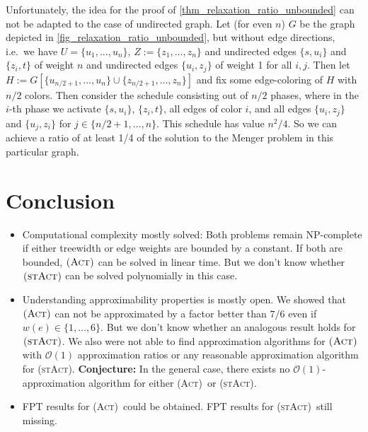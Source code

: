 \documentclass[runningheads]{llncs}
\numberwithin{equation}{section}
\newcommand{\set}[1]{\{ #1 \}}
\newcommand{\fromto}[2]{\set{#1, \ldots, #2}}
\newcommand{\bigO}{\mathcal{O}}
\newcommand{\act}{\textsc{(Act)}}
\newcommand{\stact}{\textsc{(stAct)}}
\DeclareMathOperator{\opt}{OPT}
\newcommand{\optDirAct}{\opt_\text{dir-ACT}}
\newcommand{\optDirSTP}{\opt_\text{dir-STP}}
\begin{document}

Unfortunately, the idea for the proof of \cref{thm_relaxation_ratio_unbounded} can not be adapted to the case of undirected graph. Let (for even $n$) $G$ be the graph depicted in \cref{fig_relaxation_ratio_unbounded}, but without edge directions, i.e.\ we have $U = \fromto{u_1}{u_n}$, $Z := \fromto{z_1}{z_n}$ and undirected edges $\set{s, u_i}$ and $\set{z_i,t}$ of weight $n$ and undirected edges $\set{u_i, z_j}$ of weight 1 for all $i, j$. Then let $H := G[\fromto{u_{n/2+1}}{u_n} \cup \fromto{z_{n/2+1}}{z_n}]$ and fix some edge-coloring of $H$ with $n/2$ colors. Then consider the schedule consisting out of $n/2$ phases, where in the $i$-th phase we activate $\set{s,u_i}$, $\set{z_i,t}$, all edges of color $i$, and all edges $\set{u_i,z_j}$ and $\set{u_j,z_i}$ for $j \in \fromto{n/2+1}{n}$. This schedule has value $n^2/4$. So we can achieve a ratio of at least 1/4 of the solution to the Menger problem in this particular graph.


\section{Conclusion}

\begin{itemize}
\item Computational complexity mostly solved: Both problems remain NP-complete if either treewidth or edge weights are bounded by a constant. If both are bounded, $\act$ can be solved in linear time. But we don't know whether $\stact$ can be solved polynomially in this case. 
\item Understanding approximability properties is mostly open. We showed that $\act$ can not be approximated by a factor better than $7/6$ even if $w(e) \in \fromto{1}{6}$. But we don't know whether an analogous result holds for $\stact$. We also were not able to find approximation algorithms for $\act$  with $\bigO(1)$ approximation ratios or any reasonable approximation algorithm for \stact. \textbf{Conjecture:} In the general case, there exists no $\bigO(1)$-approximation algorithm for either \act\ or \stact.
\item FPT results for \act\ could be obtained. FPT results for \stact\ still missing.
\end{itemize}
\end{document}

